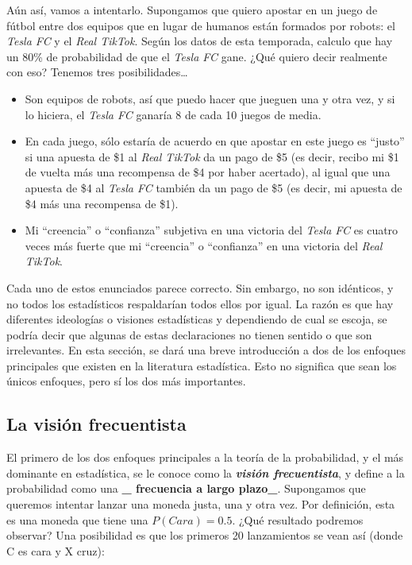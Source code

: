 \documentclass[spanish,]{book}
\providecommand{\tightlist}{%
  \setlength{\itemsep}{0pt}\setlength{\parskip}{0pt}}
\begin{document}
Aún así, vamos a intentarlo. Supongamos que quiero apostar en un juego
de fútbol entre dos equipos que en lugar de humanos están formados por
robots: el \emph{Tesla FC} y el \emph{Real TikTok}. Según los datos de
esta temporada, calculo que hay un 80\% de probabilidad de que el
\emph{Tesla FC} gane. ¿Qué quiero decir realmente con eso? Tenemos tres
posibilidades\ldots{}

\begin{itemize}
\tightlist
\item
  Son equipos de robots, así que puedo hacer que jueguen una y otra vez,
  y si lo hiciera, el \emph{Tesla FC} ganaría 8 de cada 10 juegos de
  media.
\item
  En cada juego, sólo estaría de acuerdo en que apostar en este juego es
  ``justo'' si una apuesta de \$1 al \emph{Real TikTok} da un pago de
  \$5 (es decir, recibo mi \$1 de vuelta más una recompensa de \$4 por
  haber acertado), al igual que una apuesta de \$4 al \emph{Tesla FC}
  también da un pago de \$5 (es decir, mi apuesta de \$4 más una
  recompensa de \$1).
\item
  Mi ``creencia'' o ``confianza'' subjetiva en una victoria del
  \emph{Tesla FC} es cuatro veces más fuerte que mi ``creencia'' o
  ``confianza'' en una victoria del \emph{Real TikTok}.
\end{itemize}

Cada uno de estos enunciados parece correcto. Sin embargo, no son
idénticos, y no todos los estadísticos respaldarían todos ellos por
igual. La razón es que hay diferentes ideologías o visiones estadísticas
y dependiendo de cual se escoja, se podría decir que algunas de estas
declaraciones no tienen sentido o que son irrelevantes. En esta sección,
se dará una breve introducción a dos de los enfoques principales que
existen en la literatura estadística. Esto no significa que sean los
únicos enfoques, pero sí los dos más importantes.

\subsection{La visión frecuentista}\label{la-vision-frecuentista}

El primero de los dos enfoques principales a la teoría de la
probabilidad, y el más dominante en estadística, se le conoce como la
\textbf{\emph{visión frecuentista}}, y define a la probabilidad como una
\textbf{\_ frecuencia a largo plazo\_}. Supongamos que queremos intentar
lanzar una moneda justa, una y otra vez. Por definición, esta es una
moneda que tiene una \(P(Cara) = 0.5\). ¿Qué resultado podremos
observar? Una posibilidad es que los primeros 20 lanzamientos se vean
así (donde C es cara y X cruz):
\end{document}
